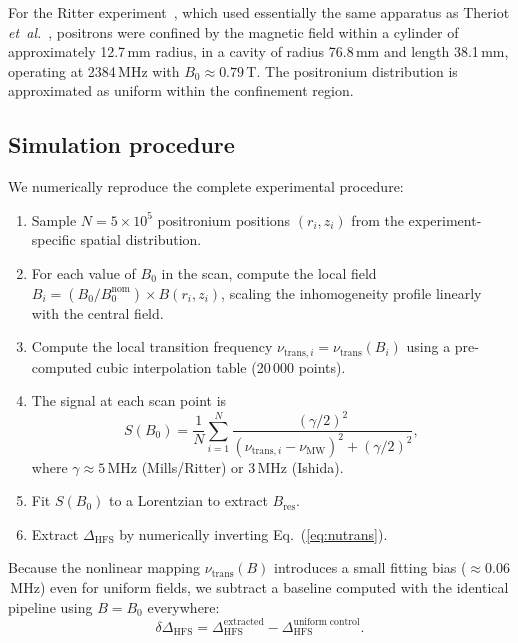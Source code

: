 \documentclass[twocolumn,pra,aps,superscriptaddress,floatfix,10pt]{revtex4-2}
\begin{document}
For the Ritter experiment~\cite{Ritter1984}, which used essentially the same apparatus as Theriot \textit{et~al.}~\cite{Theriot1970}, positrons were confined by the magnetic field within a cylinder of approximately 12.7\,mm radius, in a cavity of radius 76.8\,mm and length 38.1\,mm, operating at 2384\,MHz with $B_0 \approx 0.79$\,T. The positronium distribution is approximated as uniform within the confinement region.

\subsection{Simulation procedure}
\label{sec:simulation}

We numerically reproduce the complete experimental procedure:

\begin{enumerate}
  \item Sample $N = 5 \times 10^5$ positronium positions $(r_i, z_i)$ from the experiment-specific spatial distribution.
  \item For each value of $B_0$ in the scan, compute the local field $B_i = (B_0/B_0^\mathrm{nom}) \times B(r_i, z_i)$, scaling the inhomogeneity profile linearly with the central field.
  \item Compute the local transition frequency $\nu_{\mathrm{trans},i} = \nu_\mathrm{trans}(B_i)$ using a pre-computed cubic interpolation table (20\,000 points).
  \item The signal at each scan point is
  \begin{equation}
    S(B_0) = \frac{1}{N}\sum_{i=1}^N \frac{(\gamma/2)^2}{(\nu_{\mathrm{trans},i} - \nu_\mathrm{MW})^2 + (\gamma/2)^2},
    \label{eq:signal}
  \end{equation}
  where $\gamma \approx 5$\,MHz (Mills/Ritter) or $3$\,MHz (Ishida).
  \item Fit $S(B_0)$ to a Lorentzian to extract $B_\mathrm{res}$.
  \item Extract $\Delta_\mathrm{HFS}$ by numerically inverting Eq.~(\ref{eq:nutrans}).
\end{enumerate}

Because the nonlinear mapping $\nu_\mathrm{trans}(B)$ introduces a small fitting bias ($\approx 0.06$\,MHz) even for uniform fields, we subtract a baseline computed with the identical pipeline using $B = B_0$ everywhere:
\begin{equation}
  \delta\Delta_\mathrm{HFS} = \Delta_\mathrm{HFS}^\mathrm{extracted} - \Delta_\mathrm{HFS}^\mathrm{uniform\;control}.
  \label{eq:shift}
\end{equation}
\end{document}
